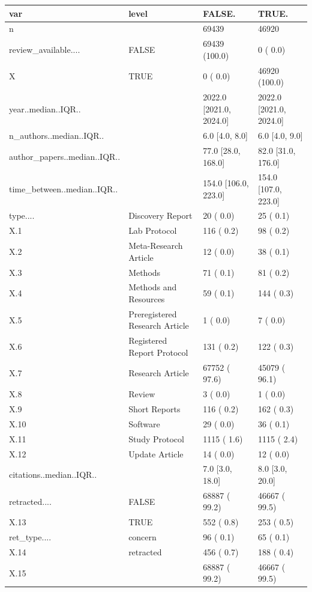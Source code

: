 \begin{table}[ht]
\centering
\begin{tabular}{llll}
 var & level & FALSE. & TRUE. \\ 
  \hline
n &  &  69439 &  46920 \\ 
  review\_available.... & FALSE &  69439 (100.0)  &      0 (  0.0)  \\ 
  X & TRUE &      0 (  0.0)  &  46920 (100.0)  \\ 
  year..median..IQR.. &  & 2022.0 [2021.0, 2024.0] & 2022.0 [2021.0, 2024.0] \\ 
  n\_authors..median..IQR.. &  &    6.0 [4.0, 8.0] &    6.0 [4.0, 9.0] \\ 
  author\_papers..median..IQR.. &  &   77.0 [28.0, 168.0] &   82.0 [31.0, 176.0] \\ 
  time\_between..median..IQR.. &  &  154.0 [106.0, 223.0] &  154.0 [107.0, 223.0] \\ 
  type.... & Discovery Report &     20 (  0.0)  &     25 (  0.1)  \\ 
  X.1 & Lab Protocol &    116 (  0.2)  &     98 (  0.2)  \\ 
  X.2 & Meta-Research Article &     12 (  0.0)  &     38 (  0.1)  \\ 
  X.3 & Methods &     71 (  0.1)  &     81 (  0.2)  \\ 
  X.4 & Methods and Resources &     59 (  0.1)  &    144 (  0.3)  \\ 
  X.5 & Preregistered Research Article &      1 (  0.0)  &      7 (  0.0)  \\ 
  X.6 & Registered Report Protocol &    131 (  0.2)  &    122 (  0.3)  \\ 
  X.7 & Research Article &  67752 ( 97.6)  &  45079 ( 96.1)  \\ 
  X.8 & Review &      3 (  0.0)  &      1 (  0.0)  \\ 
  X.9 & Short Reports &    116 (  0.2)  &    162 (  0.3)  \\ 
  X.10 & Software &     29 (  0.0)  &     36 (  0.1)  \\ 
  X.11 & Study Protocol &   1115 (  1.6)  &   1115 (  2.4)  \\ 
  X.12 & Update Article &     14 (  0.0)  &     12 (  0.0)  \\ 
  citations..median..IQR.. &  &    7.0 [3.0, 18.0] &    8.0 [3.0, 20.0] \\ 
  retracted.... & FALSE &  68887 ( 99.2)  &  46667 ( 99.5)  \\ 
  X.13 & TRUE &    552 (  0.8)  &    253 (  0.5)  \\ 
  ret\_type.... & concern &     96 (  0.1)  &     65 (  0.1)  \\ 
  X.14 & retracted &    456 (  0.7)  &    188 (  0.4)  \\ 
  X.15 &  &  68887 ( 99.2)  &  46667 ( 99.5)  \\ 
  \end{tabular}
\end{table}
